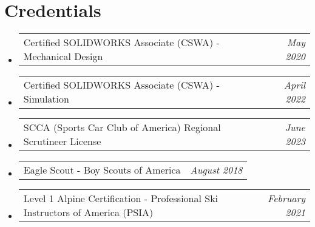 \documentclass[letterpaper,11pt]{article}
\makeatletter
\newcommand{\credentialListStart}{
  \vspace{-4pt}
  \begin{itemize}[label=\tiny$\bullet$, leftmargin=0.25in] %
}
\newcommand{\credentialListEnd}{
  \end{itemize}\vspace{-5pt}
}
\newcommand{\credential}[2]{
  \item
  \begin{tabular*}{0.94\textwidth}[t]{l@{\extracolsep{\fill}}r}
    \textnormal{\small#1} & \textit{\small #2} \\
  \end{tabular*}\vspace{-8pt}
}
\makeatother
\begin{document}
\section{Credentials}
    \credentialListStart
        \credential{Certified SOLIDWORKS Associate (CSWA) - Mechanical Design}{May 2020}
        \credential{Certified SOLIDWORKS Associate (CSWA) - Simulation}{April 2022}
        \credential{SCCA (Sports Car Club of America) Regional Scrutineer License}{June 2023}
        \credential{Eagle Scout - Boy Scouts of America}{August 2018}
        \credential{Level 1 Alpine Certification - Professional Ski Instructors of America (PSIA) }{February 2021}
    \credentialListEnd
    
\end{document}
